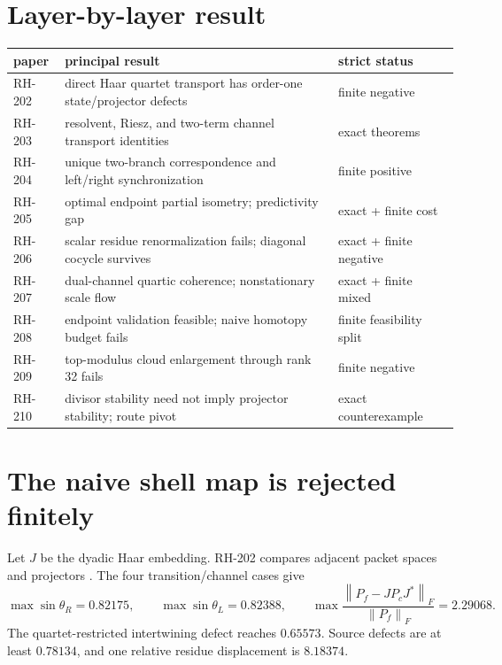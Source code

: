 \documentclass[12pt]{article}
\theoremstyle{remark}\newtheorem{remark}[theorem]{Remark}
\newcommand{\norm}[1]{\left\lVert#1\right\rVert}
\begin{document}
\section{Layer-by-layer result}

\begin{center}
\small
\begin{tabular}{p{}p{}p{}}
\toprule
paper & principal result & strict status\\
\midrule
RH-202 & direct Haar quartet transport has order-one state/projector defects
& finite negative\\
RH-203 & resolvent, Riesz, and two-term channel transport identities
& exact theorems\\
RH-204 & unique two-branch correspondence and left/right synchronization
& finite positive\\
RH-205 & optimal endpoint partial isometry; predictivity gap
& exact + finite cost\\
RH-206 & scalar residue renormalization fails; diagonal cocycle survives
& exact + finite negative\\
RH-207 & dual-channel quartic coherence; nonstationary scale flow
& exact + finite mixed\\
RH-208 & endpoint validation feasible; naive homotopy budget fails
& finite feasibility split\\
RH-209 & top-modulus cloud enlargement through rank 32 fails
& finite negative\\
RH-210 & divisor stability need not imply projector stability; route pivot
& exact counterexample\\
\bottomrule
\end{tabular}
\end{center}

\section{The naive shell map is rejected finitely}

Let $J$ be the dyadic Haar embedding.  RH-202 compares adjacent packet
spaces and projectors \citep{WangRH202}.  The four transition/channel cases
give
\begin{equation}\label{eq:state-negative}
 \max\sin\theta_R=0.82175,
 \qquad \max\sin\theta_L=0.82388,
 \qquad \max\frac{\norm{P_f-JP_cJ^*}_F}{\norm{P_f}_F}=2.29068.
\end{equation}
The quartet-restricted intertwining defect reaches $0.65573$.  Source defects
are at least $0.78134$, and one relative residue displacement is $8.18374$.
\end{document}
